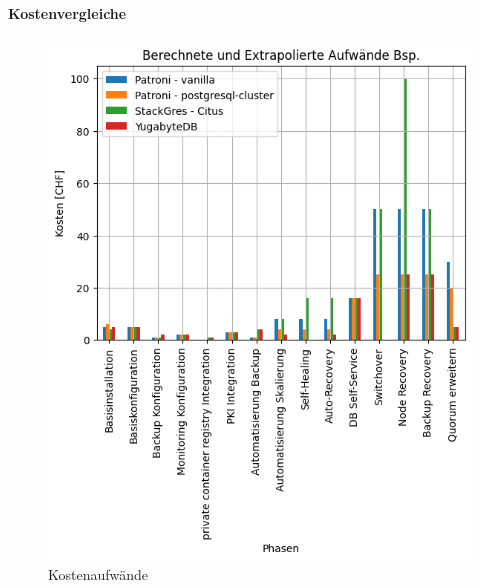 \begin{flushleft}
    \paragraph{Kostenvergleiche}

    \begin{figure}[H]
        \centering
        \includegraphics[width=1\linewidth]{source/pandas_data_chart_plotter/cost_investment}
        \caption{Kostenaufwände}
        \label{fig:cost_investment}
    \end{figure}
\end{flushleft}
